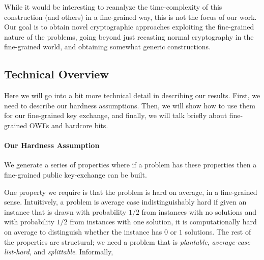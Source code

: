 While it would be interesting to reanalyze the time-complexity of this construction (and others) in a fine-grained way, this is not the focus of our work. Our goal is to obtain novel cryptographic approaches exploiting the fine-grained nature of the problems, going beyond just recasting normal cryptography in the fine-grained world, and obtaining somewhat generic constructions.


\subsection{Technical Overview}
Here we will go into a bit more technical detail in describing our results. First, we need to describe our hardness assumptions. Then, we will show how to use them for our fine-grained key exchange, and finally, we will talk briefly about fine-grained OWFs and hardcore bits.

\paragraph{Our Hardness Assumption}

We generate a series of properties where if a problem has these properties then a fine-grained public key-exchange can be built.

One property we require is that the problem is hard on average, in a fine-grained sense. Intuitively, a problem is average case indistinguishably hard if given an instance that is drawn with probability $1/2$ from instances with no solutions and with probability $1/2$ from instances with one solution, it is computationally hard on average to distinguish whether the instance has $0$ or $1$ solutions.
The rest of the properties are structural; we need a problem that is \emph{plantable}, \emph{average-case list-hard}, and \emph{splittable}. Informally,

